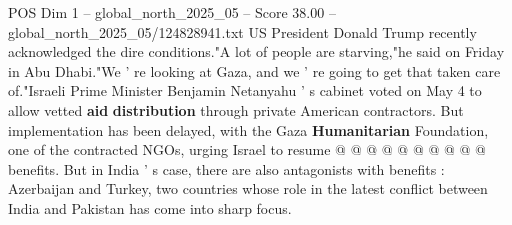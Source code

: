 \begin{textsample}{POS Dim 1 – global\_north\_2025\_05 – Score 38.00 – global\_north\_2025\_05/124828941.txt}
US President Donald Trump recently acknowledged the dire conditions."A lot of people are starving,"he said on Friday in Abu Dhabi."We ' re looking at Gaza, and we ' re going to get that taken care of."Israeli Prime Minister Benjamin Netanyahu ' s cabinet voted on May 4 to allow vetted \textbf{aid} \textbf{distribution} through private American contractors.
But implementation has been delayed, with the Gaza \textbf{Humanitarian} Foundation, one of the contracted NGOs, urging Israel to resume @ @ @ @ @ @ @ @ @ @ benefits.
But in India ' s case, there are also antagonists with benefits : Azerbaijan and Turkey, two countries whose role in the latest conflict between India and Pakistan has come into sharp focus.

\end{textsample}

